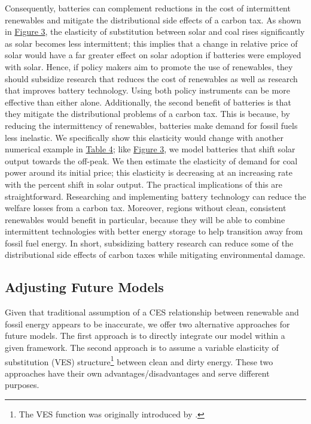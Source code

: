 \documentclass[11pt,a4paper]{extarticle}
\begin{document}
Consequently, batteries can complement reductions in the cost of intermittent renewables and mitigate the distributional side effects of a carbon tax. As shown in \hyperref[fig:battery]{Figure 3}, the elasticity of substitution between solar and coal rises significantly as solar becomes less intermittent; this implies that a change in relative price of solar would have a far greater effect on solar adoption if batteries were employed with solar. Hence, if policy makers aim to promote the use of renewables, they should subsidize research that reduces the cost of renewables as well as research that improves battery technology. Using both policy instruments can be more effective than either alone. Additionally, the second benefit of batteries is that they mitigate the distributional problems of a carbon tax. This is because, by reducing the intermittency of renewables, batteries make demand for fossil fuels less inelastic. We specifically show this elasticity would change with another numerical example in \hyperref[table:4]{Table 4}; like  \hyperref[fig:battery]{Figure 3}, we model batteries that shift solar output towards the off-peak. We then estimate the elasticity of demand for coal power around its initial price; this elasticity is decreasing at an increasing rate with the percent shift in solar output. The practical implications of this are straightforward. Researching and implementing battery technology can reduce the welfare losses from a carbon tax. Moreover, regions without clean, consistent renewables would benefit in particular, because they will be able to combine intermittent technologies with better energy storage to help transition away from fossil fuel energy. In short, subsidizing battery research can reduce some of the distributional side effects of carbon taxes while mitigating environmental damage. 

\subsection{Adjusting Future Models}

Given that traditional assumption of a CES relationship between renewable and fossil energy appears to be inaccurate, we offer two alternative approaches for future models. The first approach is to directly integrate our model within a given framework. The second approach is to assume a variable elasticity of substitution (VES) structure\footnote{ The VES function was originally introduced by \citet{VES}.} between clean and dirty energy. These two approaches have their own advantages/disadvantages and serve different purposes. 
\end{document}
